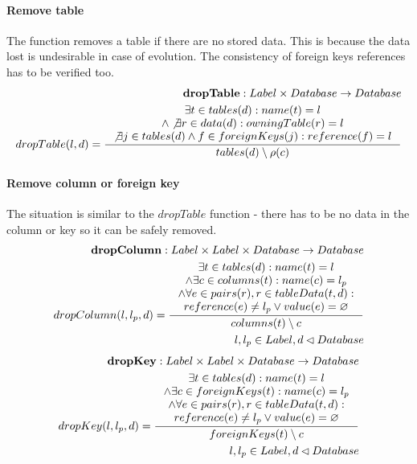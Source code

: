 \documentclass[11pt]{article}
\begin{document}
\paragraph{Remove table} The function removes a table if there are no stored data. This is because the data lost is undesirable in case of evolution. The consistency of foreign keys references has to be verified too.
\begin{align*}
	\mathbf{dropTable} : Label \times Database \rightarrow Database \\
	dropTable(l,d) = \inference{ \exists t \in tables(d) : name(t) = l  \\ \wedge \not \exists r \in data(d) : owningTable(r) = l \\  \not \exists j \in tables(d) \wedge f \in foreignKeys(j) : reference(f) = l }{ tables(d) \setminus \rho(c)}
\end{align*}

\paragraph{Remove column or foreign key} The situation is similar to the $dropTable$ function - there has to be no data in the column or key so it can be safely removed.
\begin{align*}
	\mathbf{dropColumn} : Label \times Label \times Database \rightarrow Database \\
	dropColumn(l, l_p, d) = \inference{ \exists t \in tables(d) : name(t) = l \\ \wedge \exists c \in columns(t) : name(c) = l_p \\ \wedge \forall e \in  pairs(r), r \in tableData(t, d) : \\ reference(e) \neq l_p \vee value(e) = \varnothing  }{columns(t) \setminus c}\\
	 l , l_p\in Label, d \lhd Database 
\end{align*}
\begin{align*}
	\mathbf{dropKey} : Label \times Label \times Database \rightarrow Database \\
	dropKey(l, l_p, d) = \inference{ \exists t \in tables(d) : name(t) = l \\ \wedge \exists c \in foreignKeys(t) : name(c) = l_p \\ \wedge \forall e \in  pairs(r), r \in tableData(t, d) : \\ reference(e) \neq l_p \vee value(e) = \varnothing  }{foreignKeys(t) \setminus c}\\
	 l, l_p \in Label, d \lhd Database 
\end{align*}
\end{document}
